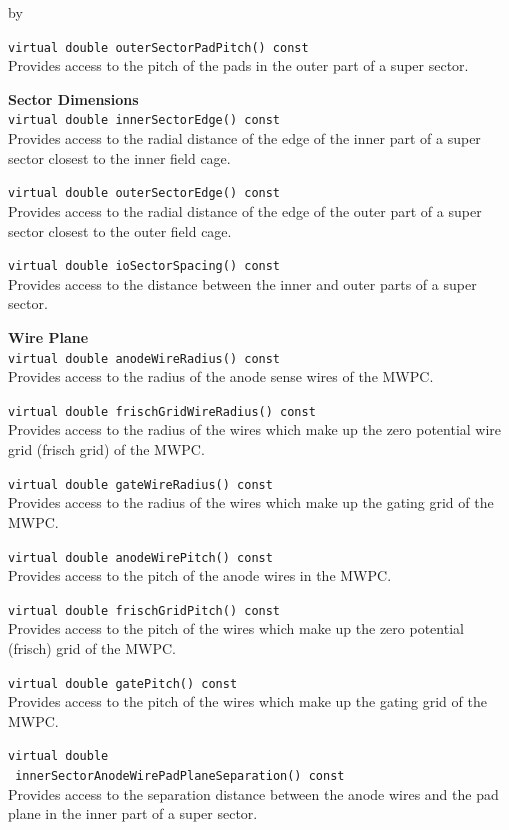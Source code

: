 \documentclass[twoside]{article}
\newcommand{\entrylabel}[1]{\mbox{\textbf{{#1}}}\hfil}%
\newenvironment{entry}
{\begin{list}{}%
    {\renewcommand{\makelabel}{\entrylabel}%
     \setlength{\labelwidth}{90pt}%
     \setlength{\leftmargin}{\labelwidth}
     \advance\leftmargin by \labelsep%
      }%
    }%
  {\end{list}}
\newcommand{\Entrylabel}[1]%
{\raisebox{0pt}[1ex][0pt]{\makebox[\labelwidth][l]%
    {\parbox[t]{\labelwidth}{\hspace{0pt}\textbf{{#1}}}}}}
\newenvironment{Entry}%
{\renewcommand{\entrylabel}{\Entrylabel}\begin{entry}}%
  {\end{entry}}
\begin{document}
\begin{Entry}
  \verb+virtual double outerSectorPadPitch() const+\\
  Provides access to the pitch of the pads in the outer part of a
  super sector.

  {\bf Sector Dimensions \\}
  \verb+virtual double innerSectorEdge() const+\\
  Provides access to the radial distance of the edge of the inner
  part of a super sector closest to the inner field cage.

  \verb+virtual double outerSectorEdge() const+\\
  Provides access to the radial distance of the edge of the outer
  part of a super sector closest to the outer field cage.

  \verb+virtual double ioSectorSpacing() const+\\
  Provides access to the distance between the inner and outer parts
  of a super sector.
    
  {\bf  Wire Plane \\}
  \verb+virtual double anodeWireRadius() const+\\
  Provides access to the radius of the anode sense wires of the
  MWPC.

  \verb+virtual double frischGridWireRadius() const+\\
  Provides access to the radius of the wires which make up the 
  zero potential wire grid (frisch grid) of the MWPC.

  \verb+virtual double gateWireRadius() const+\\
  Provides access to the radius of the wires which make up the gating grid
  of the MWPC.
    
  \verb+virtual double anodeWirePitch() const+\\
  Provides access to the pitch of the anode wires in the MWPC.

  \verb+virtual double frischGridPitch() const+\\
  Provides access to the pitch of the wires which make up the zero potential
  (frisch) grid of the MWPC.
 
  \verb+virtual double gatePitch() const+\\
  Provides access to the pitch of the wires which make up the gating grid
  of the MWPC.
    
  \verb+virtual double+\\
  \verb+ innerSectorAnodeWirePadPlaneSeparation() const+\\
  Provides access to the separation distance between the anode wires
  and the pad plane in the inner part of a super sector.


\end{Entry}
\end{document}
